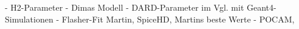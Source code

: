 %
%
%
%
%

%



%


- H2-Parameter
- Dimas Modell
- DARD-Parameter im Vgl. mit Geant4-Simulationen
- Flasher-Fit Martin, SpiceHD, Martins beste Werte
- POCAM,



